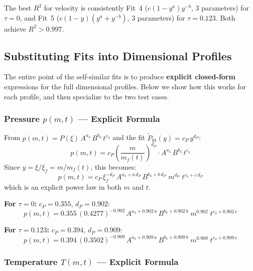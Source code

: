 \documentclass[11pt]{article}
\newcommand{\xsi}{\xi}
\newcommand{\xsif}{\xi_f}
\begin{document}
\begin{notebox}
The best $R^2$ for velocity is consistently Fit~4 ($c(1-y^a)y^{-b}$, 3 parameters) for $\tau=0$, and Fit~5 ($c(1-y)(y^a + y^{-b})$, 3 parameters) for $\tau=0.123$. Both achieve $R^2 > 0.997$.
\end{notebox}

\subsection{Substituting Fits into Dimensional Profiles}
\label{sec:explicit_profiles}

The entire point of the self-similar fits is to produce \textbf{explicit closed-form} expressions for the full dimensional profiles. Below we show how this works for each profile, and then specialize to the two test cases.

\subsubsection{Pressure $p(m,t)$ --- Explicit Formula}

From $p(m,t) = P(\xsi)\,A^{a_3}\,B^{b_3}\,t^{c_3}$ and the fit $\tilde{P}_{\mathrm{fit}}(y) = c_P\,y^{d_P}$:
\begin{equation}
  \boxed{p(m,t) = c_P \left(\frac{m}{m_f(t)}\right)^{d_P}\!\cdot A^{a_3}\,B^{b_3}\,t^{c_3}}
\end{equation}
Since $y = \xsi/\xsif = m/m_f(t)$, this becomes:
\begin{equation}
  p(m,t) = c_P\,\xsif^{-d_P}\,A^{a_3 + a\,d_P}\,B^{b_3+b\,d_P}\;m^{d_P}\;t^{c_3+c\,d_P}
\end{equation}
which is an explicit power law in both $m$ and $t$.

\textbf{For $\tau=0$:} $c_P = 0.355$, $d_P = 0.902$:
\begin{equation}
  p(m,t) = 0.355\,(0.4277)^{-0.902}\,A^{a_3 + 0.902\,a}\,B^{b_3+0.902\,b}\;m^{0.902}\;t^{c_3+0.902\,c}
\end{equation}

\textbf{For $\tau=0.123$:} $c_P = 0.394$, $d_P = 0.909$:
\begin{equation}
  p(m,t) = 0.394\,(0.3502)^{-0.909}\,A^{a_3 + 0.909\,a}\,B^{b_3+0.909\,b}\;m^{0.909}\;t^{c_3+0.909\,c}
\end{equation}

\subsubsection{Temperature $T(m,t)$ --- Explicit Formula}
\end{document}
